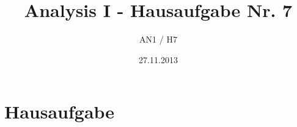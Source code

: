 \documentclass[a4paper,10pt,reqno]{amsart}
\numberwithin{equation}{section}
\begin{document}
% 
\title{Analysis I - Hausaufgabe Nr. 7}
\author{AN1 / H7}
\date{27.11.2013}
%
\newpage
%
\setcounter{section}{6}
%
\section{Hausaufgabe}
\subsection{}
%
%
%
\end{document}
